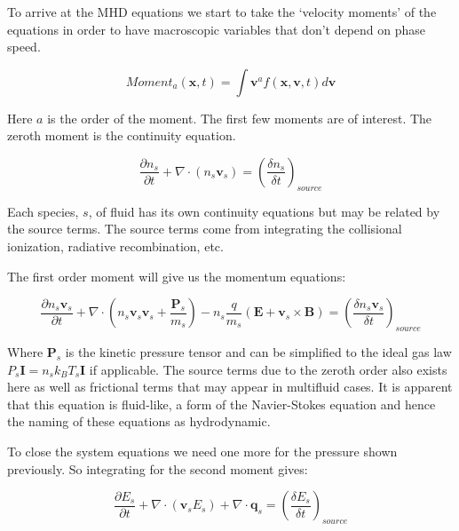 \documentclass[12pt,upcase]{umlthesis}
\begin{document}
To arrive at the MHD equations we start to take the `velocity moments' of the equations in order to have macroscopic variables that don't depend on phase speed.

\begin{equation}
	{Moment}_a(\textbf{x}, t) = \int{\textbf{v}^a f(\textbf{x}, \textbf{v}, t)}d\textbf{v}
\end{equation}

Here $a$ is the order of the moment. The first few moments are of interest. The zeroth moment is the continuity equation.

\begin{equation}\label{eq:continuityequation}
	\frac{\partial n_s}{\partial t} + \nabla \cdot (n_s \textbf{v}_s) = {(\frac{\delta n_s}{\delta t})}_{source}
\end{equation}

Each species, $s$, of fluid has its own continuity equations but may be related by the source terms. The source terms come from integrating the collisional ionization, radiative recombination, etc.

The first order moment will give us the momentum equations:

\begin{equation}\label{eq:momentumequation}
	\frac{\partial n_s \textbf{v}_s}{\partial t} + \nabla \cdot (n_s \textbf{v}_s \textbf{v}_s + \frac{\textbf{P}_s}{m_s} ) -n_s \frac{q}{m_s}(\textbf{E} + \textbf{v}_s \times \textbf{B}) = {(\frac{\delta n_s \textbf{v}_s}{\delta t})}_{source}
\end{equation}

Where $\textbf{P}_s$ is the kinetic pressure tensor and can be simplified to the ideal gas law $P_s\textbf{I} = n_s k_B T_s \textbf{I}$ if applicable. The source terms due to the zeroth order also exists here as well as frictional terms that may appear in multifluid cases. It is apparent that this equation is fluid-like, a form of the Navier-Stokes equation and hence the naming of these equations as hydrodynamic.

To close the system equations we need one more for the pressure shown previously. So integrating for the second moment gives:

\begin{equation}\label{eq:energyequation}
	\frac{\partial E_s}{\partial t} + \nabla \cdot (\textbf{v}_s E_s) + \nabla \cdot \textbf{q}_s = {(\frac{\delta E_s}{\delta t})}_{source}
\end{equation}
\end{document}
